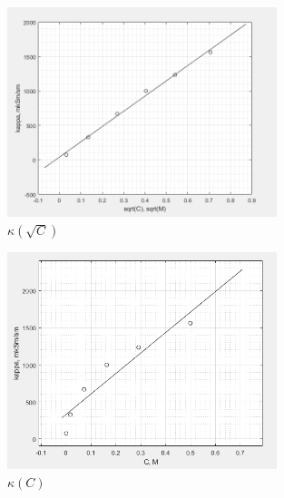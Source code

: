 \documentclass[a4paper, 12pt]{article}
\begin{document}
\begin{figure}[h!]
    \begin{center}
    \includegraphics[width=0.7\textwidth]{4_1_kappa_sqrt.png}
    \end{center}
    \caption{$\kappa(\sqrt{C})$}
\end{figure}

\begin{figure}[h!]
    \begin{center}
    \includegraphics[width=0.7\textwidth]{4_2_kappa_C.png}
    \end{center}
    \caption{$\kappa(C)$}
\end{figure}

\newpage
\end{document}
